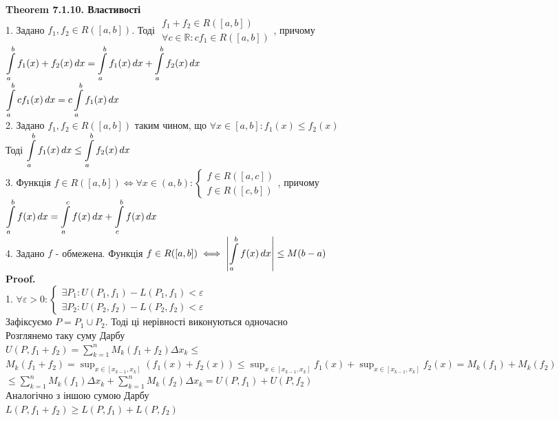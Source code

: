 \documentclass[a4paper, 14pt]{extarticle}
\def\huge{\displaystyle}
\def\bigline{\vspace{5mm}\\}
\def\th#1{\textbf{Theorem {#1}}}
\def\proof{\textbf{Proof.}\\}
\def\bigline{\vspace{5mm}\\}
\begin{document}
\th{7.1.10. Властивості}\\
1. Задано $f_1, f_2 \in R([a,b])$. Тоді $\begin{gathered} f_1 + f_2 \in R \left( \left[ a,b \right] \right) \\ \forall c \in \mathbb{R}: cf_1 \in R \left( \left[ a,b \right] \right) \end{gathered}$, причому\\
$\huge\int\displaylimits_a^b f_1(x)+f_2(x)\,dx = \int\displaylimits_a^b f_1(x)\,dx + \int\displaylimits_a^b f_2(x)\,dx$\\
$\huge\int\displaylimits_a^b c f_1(x) \,dx = c \int\displaylimits_a^b f_1(x)\,dx$
\bigline
2. Задано $f_1, f_2 \in R([a,b])$ таким чином, що $\forall x \in [a,b]: f_1(x) \leq f_2(x)$\\
Тоді $\huge\int\displaylimits_a^b f_1(x)\,dx \leq \int\displaylimits_a^b f_2(x)\,dx$
\bigline
3. Функція $f \in R([a,b]) \iff \forall x \in (a,b): \begin{cases} f \in R([a,c]) \\ f \in R([c,b]) \end{cases}$, причому\\
$\huge \int\displaylimits_a^b f(x)\,dx = \int\displaylimits_a^c f(x)\,dx + \int\displaylimits_c^b f(x)\,dx$
\bigline
4. Задано $f$ - обмежена. Функція $f \in R([a,b]) \iff \abs{\huge\int\displaylimits_a^b f(x)\,dx} \leq M(b-a)$\\
\proof
1. $\forall \varepsilon > 0: \begin{cases}
\exists P_1: U(P_1,f_1) - L(P_1,f_1) < \varepsilon \\
\exists P_2: U(P_2,f_2) - L(P_2,f_2) < \varepsilon
 \end{cases}$\\
Зафіксуємо $P = P_1 \cup P_2$. Тоді ці нерівності виконуються одночасно\\
Розглянемо таку суму Дарбу\\
$U(P,f_1+f_2) = \huge\sum_{k=1}^n M_k(f_1 + f_2) \Delta x_k \boxed{\leq}$\\
$M_k(f_1+f_2) = \huge\sup_{x \in [x_{k-1},x_k]} (f_1(x) + f_2(x)) \leq \sup_{x \in [x_{k-1},x_k]} f_1(x) + \sup_{x \in [x_{k-1},x_k]} f_2(x) = M_k(f_1) + M_k(f_2)$\\
$\boxed{\leq} \huge\sum_{k=1}^n M_k(f_1) \Delta x_k + \huge\sum_{k=1}^n M_k(f_2) \Delta x_k = U(P,f_1) + U(P,f_2)$\\
Аналогічно з іншою сумою Дарбу\\
$L(P, f_1+f_2) \geq L(P,f_1) + L(P,f_2)$\\
\end{document}

